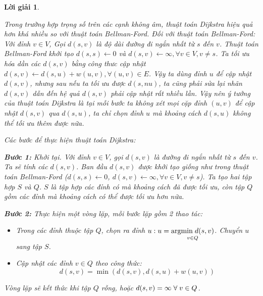 \documentclass[14pt, a4paper]{article}
\theoremstyle{sltheorem}
\theoremstyle{soltheorem}
\newtheorem*{loigiai}{Lời giải}
\begin{document}
\begin{loigiai}
\begin{itemize}
\begin{itemize}
                Trong trường hợp trọng số trên các cạnh không âm, thuật toán Dijkstra hiệu quả hơn khá nhiều so với thuật toán Bellman-Ford.
                Đối với thuật toán Bellman-Ford: Với đỉnh $v \in V$, Gọi $d(s, v)$ là độ dài đường đi ngắn nhất từ $s$ đến $v$.
                Thuật toán Bellman-Ford khởi tạo $d(s, s) \gets 0$ và $d(s, v) \gets \infty, \forall v \in V, v \neq s$.
                Ta tối ưu hóa dần các $d(s, v)$ bằng công thưc cập nhật $d(s, v) \gets d(s, u) + w(u, v), \forall (u, v) \in E$.
                Vậy ta dùng đỉnh $u$ để cập nhật $d(s, v)$, nhưng sau nếu ta tối ưu được $d(s, nu)$, ta cũng phải sửa lại nhãn $d(s, v)$ dẫn đến hệ quả $d(s, v)$ phải cập nhật rất nhiều lần.
                Vậy nên ý tưởng của thuật toán Dijkstra là tại mỗi bước ta không xét mọi cặp đỉnh $(u,v)$ để cập nhật $d(s, v)$ qua $d(s, u)$,
                ta chỉ chọn đỉnh $u$ mà khoảng cách $d(s, u)$ không thể tối ưu thêm được nữa.

                Các bước để thực hiện thuật toán Dijkstra:

                \textbf{Bước 1:} Khởi tại. Với đỉnh $v \in V$, gọi $d(s, v)$ là đường đi ngắn nhất từ $s$ đến $v$.
                Ta sẽ tính các $d(s, v)$. Ban đầu $d(s, v)$ được khởi tạo giống như trong thuật toán Bellman-Ford ($d(s, s) \gets 0$, $d(s, v) \gets \infty, \forall v \in V, v \neq s$).
                Ta tạo hai tập hợp $S$ và $Q$. $S$ là tập hợp các đỉnh có mà khoảng cách đã được tối ưu, còn tập $Q$ gồm các đỉnh mà khoảng cách có thể được tối ưu hơn nữa.

                \textbf{Bước 2:} Thực hiện một vòng lặp, mỗi bước lặp gồm 2 thao tác:

                \begin{itemize}
                    \item Trong các đỉnh thuộc tập $Q$, chọn ra đỉnh $u: u = \underset{v \in Q}{\mathrm{argmin} \thickspace d(s, v)}$.
                    Chuyển $u$ sang tập $S$.
                    \item Cập nhật các đỉnh $v \in Q$ theo công thức:
                    \begin{equation*}
                        d(s, v) = \min(d(s, v), d(s, u) + w(u, v))
                    \end{equation*}
                \end{itemize}

                Vòng lặp sẽ kết thức khi tập $Q$ rỗng, hoặc $d(s, v) = \infty \thickspace \forall \thickspace v \in Q$.


\end{itemize}
\end{itemize}
\end{loigiai}
\end{document}
